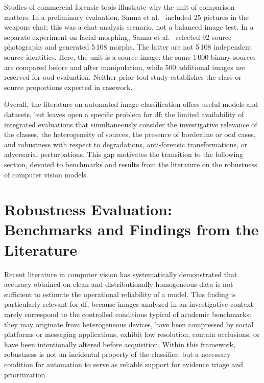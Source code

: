 Studies of commercial forensic tools illustrate why the unit of comparison
matters. In a preliminary evaluation, Sanna et
al.~\cite[Sec.~4.1]{sanna2024preliminary} included 25 pictures in the
weapons chat; this was a chat-analysis scenario, not a balanced image test.
In a separate experiment on facial morphing, Sanna et
al.~\cite{sanna2025pixelperfect} selected 92 source photographs and generated
5\,108 morphs. The latter are not 5\,108 independent source identities.
Here, the unit is a source image: the same 1\,000 binary sources are
compared before and after manipulation, while 500 additional images are
reserved for \gls{ood} evaluation. Neither prior tool study establishes the
class or source proportions expected in casework.

Overall, the literature on automated image classification offers useful models
and datasets, but leaves open a specific problem for \gls{df}: the limited
availability of integrated evaluations that simultaneously consider the
investigative relevance of the classes, the heterogeneity of sources, the
presence of borderline or \gls{ood} cases, and robustness with respect to
degradations, anti-forensic transformations, or adversarial perturbations. This
gap motivates the transition to the following section, devoted to benchmarks
and results from the literature on the robustness of computer vision models.


\section{Robustness Evaluation: Benchmarks and Findings from the Literature}
\label{sec:sota-robustness-benchmarks}

Recent literature in computer vision has systematically demonstrated that
accuracy obtained on clean and distributionally homogeneous data is not
sufficient to estimate the operational reliability of a model. This finding is
particularly relevant for \gls{df}, because images analyzed in an investigative
context rarely correspond to the controlled conditions typical of academic
benchmarks: they may originate from heterogeneous devices, have been compressed
by social platforms or messaging applications, exhibit low resolution, contain
occlusions, or have been intentionally altered before acquisition. Within this
framework, robustness is not an incidental property of the classifier, but a
necessary condition for automation to serve as reliable support for evidence
triage and prioritization.

